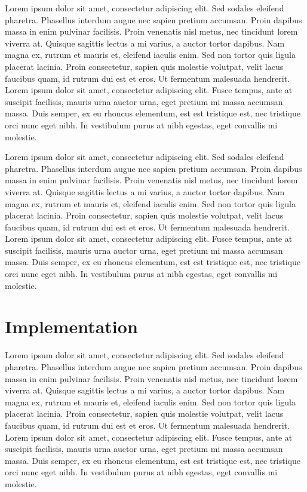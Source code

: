 Lorem ipsum dolor sit amet, consectetur adipiscing elit. Sed sodales
eleifend pharetra. Phasellus interdum augue nec sapien pretium accumsan.
Proin dapibus massa in enim pulvinar facilisis. Proin venenatis nisl metus,
nec tincidunt lorem viverra at. Quisque sagittis lectus a mi varius, a
auctor tortor dapibus. Nam magna ex, rutrum et mauris et, eleifend iaculis
enim. Sed non tortor quis ligula placerat lacinia. Proin consectetur, sapien
quis molestie volutpat, velit lacus faucibus quam, id rutrum dui est et
eros. Ut fermentum malesuada hendrerit. Lorem ipsum dolor sit amet,
consectetur adipiscing elit. Fusce tempus, ante at suscipit facilisis,
mauris urna auctor urna, eget pretium mi massa accumsan massa. Duis semper,
ex eu rhoncus elementum, est est tristique est, nec tristique orci nunc eget
nibh. In vestibulum purus at nibh egestas, eget convallis mi molestie.

Lorem ipsum dolor sit amet, consectetur adipiscing elit. Sed sodales
eleifend pharetra. Phasellus interdum augue nec sapien pretium accumsan.
Proin dapibus massa in enim pulvinar facilisis. Proin venenatis nisl metus,
nec tincidunt lorem viverra at. Quisque sagittis lectus a mi varius, a
auctor tortor dapibus. Nam magna ex, rutrum et mauris et, eleifend iaculis
enim. Sed non tortor quis ligula placerat lacinia. Proin consectetur, sapien
quis molestie volutpat, velit lacus faucibus quam, id rutrum dui est et
eros. Ut fermentum malesuada hendrerit. Lorem ipsum dolor sit amet,
consectetur adipiscing elit. Fusce tempus, ante at suscipit facilisis,
mauris urna auctor urna, eget pretium mi massa accumsan massa. Duis semper,
ex eu rhoncus elementum, est est tristique est, nec tristique orci nunc eget
nibh. In vestibulum purus at nibh egestas, eget convallis mi molestie.

\section{Implementation}
Lorem ipsum dolor sit amet, consectetur adipiscing elit. Sed sodales
eleifend pharetra. Phasellus interdum augue nec sapien pretium accumsan.
Proin dapibus massa in enim pulvinar facilisis. Proin venenatis nisl metus,
nec tincidunt lorem viverra at. Quisque sagittis lectus a mi varius, a
auctor tortor dapibus. Nam magna ex, rutrum et mauris et, eleifend iaculis
enim. Sed non tortor quis ligula placerat lacinia. Proin consectetur, sapien
quis molestie volutpat, velit lacus faucibus quam, id rutrum dui est et
eros. Ut fermentum malesuada hendrerit. Lorem ipsum dolor sit amet,
consectetur adipiscing elit. Fusce tempus, ante at suscipit facilisis,
mauris urna auctor urna, eget pretium mi massa accumsan massa. Duis semper,
ex eu rhoncus elementum, est est tristique est, nec tristique orci nunc eget
nibh. In vestibulum purus at nibh egestas, eget convallis mi molestie.


